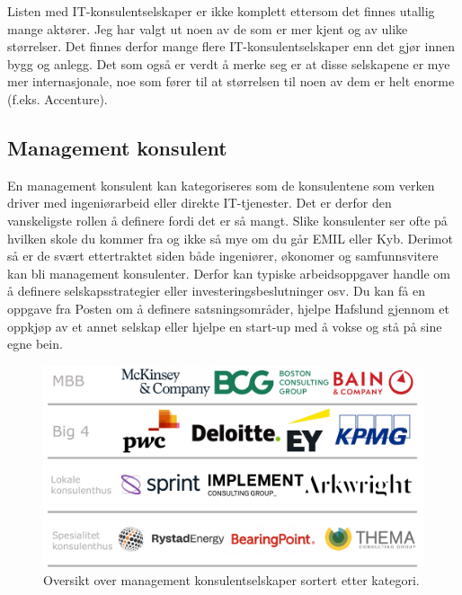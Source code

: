 Listen med IT-konsulentselskaper er ikke komplett ettersom det finnes utallig mange aktører. Jeg har valgt ut noen av de som er mer kjent og av ulike størrelser. Det finnes derfor mange flere IT-konsulentselskaper enn det gjør innen bygg og anlegg. Det som også er verdt å merke seg er at disse selskapene er mye mer internasjonale, noe som fører til at størrelsen til noen av dem er helt enorme (f.eks. Accenture).



\subsection{Management konsulent}

En management konsulent kan kategoriseres som de konsulentene som verken driver med ingeniørarbeid eller direkte IT-tjenester. Det er derfor den vanskeligste rollen å definere fordi det er så mangt. Slike konsulenter ser ofte på hvilken skole du kommer fra og ikke så mye om du går EMIL eller Kyb. Derimot så er de svært ettertraktet siden både ingeniører, økonomer og samfunnsvitere kan bli management konsulenter. Derfor kan typiske arbeidsoppgaver handle om å definere selskapsstrategier eller investeringsbeslutninger osv. Du kan få en oppgave fra Posten om å definere satsningsområder, hjelpe Hafslund gjennom et oppkjøp av et annet selskap eller hjelpe en start-up med å vokse og stå på sine egne bein. 

\begin{figure}[H]
    \centering
    \includegraphics[width=1\linewidth]{images/Manage-Konsulent.pdf}
    \caption{Oversikt over management konsulentselskaper sortert etter kategori.}
    \label{fig:enter-label}
\end{figure}

